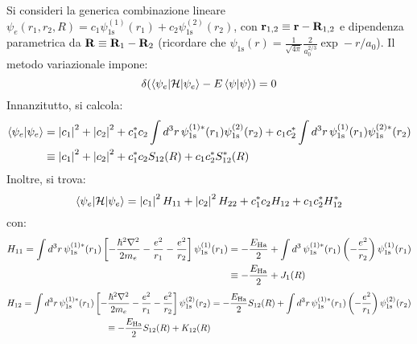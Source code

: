 Si consideri la generica combinazione lineare $ \psi_e(r_1,r_2,R) = c_1 \psi_\text{1s}^{(1)}(r_1) + c_2 \psi_\text{1s}^{(2)}(r_2) $, con $ \mathbf{r}_{1,2} \equiv \mathbf{r} - \mathbf{R}_{1,2} $ e dipendenza parametrica da $ \mathbf{R} \equiv \mathbf{R}_1 - \mathbf{R}_2 $ (ricordare che $ \psi_\text{1s}(r) = \frac{1}{\sqrt{4\pi}} \frac{2}{a_0^{2/3}} \exp -r/a_0 $). Il metodo variazionale impone:
\begin{equation}
	\delta( \braket{\psi_e | \mathcal{H} | \psi_e} - E \braket{\psi | \psi}) = 0
	\label{eq:h2-var}
\end{equation}
Innanzitutto, si calcola:
\begin{equation*}
	\begin{split}
		\braket{\psi_e | \psi_e}
		& = \left\lvert c_1\right\rvert^2 + \left\lvert c_2\right\rvert^2 + c_1^* c_2 \int d^3r\, \psi_\text{1s}^{(1)*}(r_1) \psi_\text{1s}^{(2)}(r_2) + c_1 c_2^* \int d^3r\, \psi_\text{1s}^{(1)}(r_1) \psi_\text{1s}^{(2)*}(r_2) \\
		& \equiv \left\lvert c_1\right\rvert^2 + \left\lvert c_2\right\rvert^2 + c_1^* c_2 S_{12}(R) + c_1 c_2^* S_{12}^*(R)
	\end{split}
\end{equation*}
Inoltre, si trova:
\begin{equation*}
	\braket{\psi_e | \mathcal{H} | \psi_e} = \left\lvert c_1\right\rvert^2 H_{11} + \left\lvert c_2\right\rvert^2 H_{22} + c_1^* c_2 H_{12} + c_1 c_2^* H_{12}^*
\end{equation*}
con:
\begin{equation*}
	\begin{split}
		H_{11} = \int d^3r\, \psi_\text{1s}^{(1)*}(r_1) \left[ - \frac{\hbar^2 \nabla^2}{2m_e} - \frac{e^2}{r_1} - \frac{e^2}{r_2} \right] \psi_\text{1s}^{(1)}(r_1)
		& = - \frac{E_\text{Ha}}{2} + \int d^3\, \psi_\text{1s}^{(1)*}(r_1) \left( -\frac{e^2}{r_2} \right) \psi_\text{1s}^{(1)}(r_1) \\
		& \equiv - \frac{E_\text{Ha}}{2} + J_1(R)
	\end{split}
\end{equation*}
\begin{equation*}
	\begin{split}
		H_{12} = \int d^3r\, \psi_\text{1s}^{(1)*}(r_1) \left[ - \frac{\hbar^2 \nabla^2}{2m_e} - \frac{e^2}{r_1} - \frac{e^2}{r_2} \right] \psi_\text{1s}^{(2)}(r_2)
		& = - \frac{E_\text{Ha}}{2} S_{12}(R) + \int d^3r\, \psi_\text{1s}^{(1)*}(r_1) \left( - \frac{e^2}{r_1} \right) \psi_\text{1s}^{(2)}(r_2) \\
		\equiv - \frac{E_\text{Ha}}{2} S_{12}(R) + K_{12}(R)
	\end{split}
\end{equation*}
